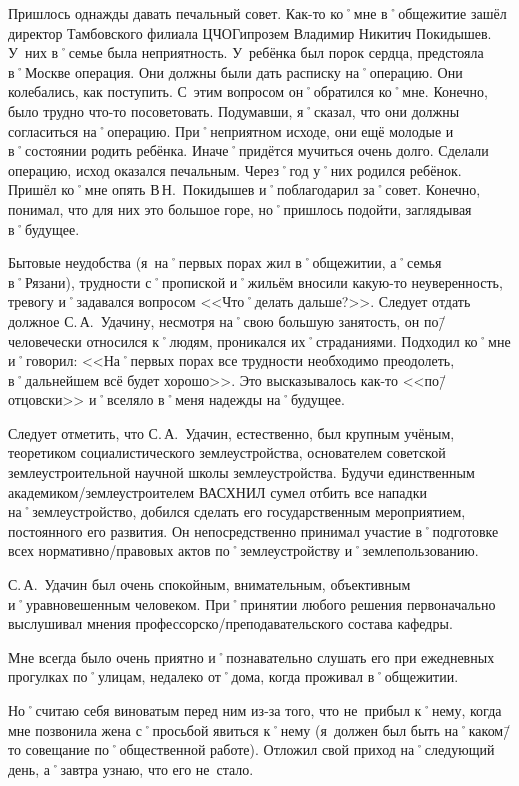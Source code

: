 Пришлось однажды давать печальный совет. Как-то ко˚мне в˚общежитие зашёл директор Тамбовского филиала ЦЧОГипрозем Владимир Никитич Покидышев. У~них в˚семье была неприятность. У~ребёнка был порок сердца, предстояла в˚Москве операция. Они должны были дать расписку на˚операцию. Они колебались, как поступить. С~этим вопросом он˚обратился ко˚мне. Конечно, было трудно что-то посоветовать. Подумавши, я˚сказал, что они должны согласиться на˚операцию. При˚неприятном исходе, они ещё молодые и в˚состоянии родить ребёнка. Иначе˚придётся мучиться очень долго. Сделали операцию, исход оказался печальным. Через˚год у˚них родился ребёнок. Пришёл ко˚мне опять В\,Н.~Покидышев и˚поблагодарил за˚совет. Конечно, понимал, что для них это большое горе, но˚пришлось подойти, заглядывая в˚будущее.

Бытовые неудобства (я~на˚первых порах жил в˚общежитии, а˚семья в˚Рязани), трудности с˚пропиской и˚жильём вносили какую-то неуверенность, тревогу и˚задавался вопросом <<Что˚делать дальше?>>. Следует отдать должное С.\,А.~Удачину, несмотря на˚свою большую занятость, он по\=/человечески относился к˚людям, проникался их˚страданиями. Подходил ко˚мне и˚говорил: <<На˚первых порах все трудности необходимо преодолеть, в˚дальнейшем всё будет хорошо>>. Это высказывалось как-то <<по\=/отцовски>> и˚вселяло в˚меня надежды на˚будущее.

Следует отметить, что С.\,А.~Удачин, естественно, был крупным учёным, теоретиком социалистического землеустройства, основателем советской землеустроительной научной школы землеустройства. Будучи единственным академиком\-/землеустроителем ВАСХНИЛ сумел отбить все нападки на˚землеустройство, добился сделать его государственным мероприятием, постоянного его развития. Он непосредственно принимал участие в˚подготовке всех нормативно\-/правовых актов по˚землеустройству и˚землепользованию. 

С.\,А.~Удачин был очень спокойным, внимательным, объективным и˚уравновешенным человеком. При˚принятии любого решения первоначально выслушивал мнения профессорско\-/преподавательского состава кафедры. 

Мне всегда было очень приятно и˚познавательно слушать его при ежедневных прогулках по˚улицам, недалеко от˚дома, когда проживал в˚общежитии.

Но˚считаю себя виноватым перед ним из-за того, что не~прибыл к˚нему, когда мне позвонила жена с˚просьбой явиться к˚нему (я~должен был быть на˚каком\=/то совещание по˚общественной работе). Отложил свой приход на˚следующий день, а˚завтра узнаю, что его не~стало.

